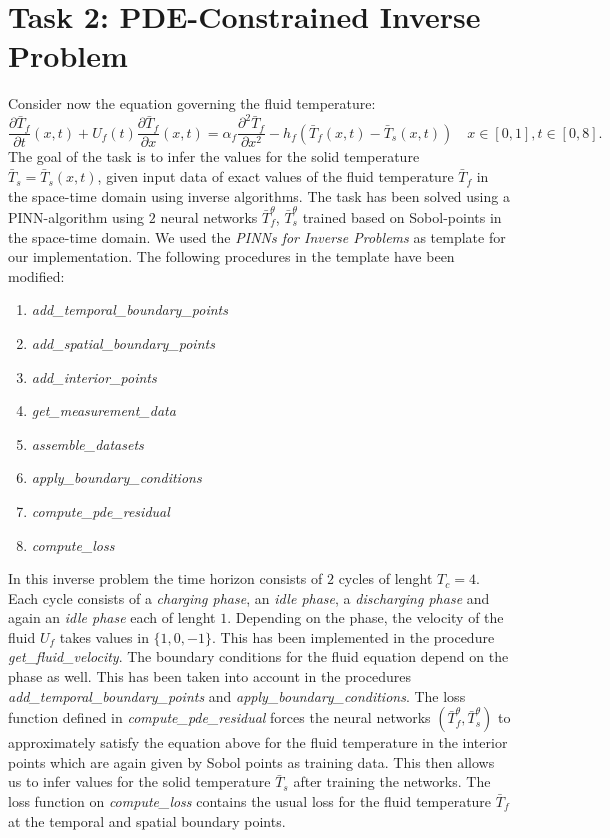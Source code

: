 \documentclass[letterpaper,12pt]{article}
\begin{document}
\section*{Task 2: PDE-Constrained Inverse Problem}
Consider now the equation governing the fluid temperature:
\begin{equation*}
\frac{\partial \bar{T}_{f}}{\partial t}(x, t)+U_{f}(t) \frac{\partial \bar{T}_{f}}{\partial x}(x, t)=\alpha_{f} \frac{\partial^{2} \bar{T}_{f}}{\partial x^{2}}-h_{f}\left(\bar{T}_{f}(x, t)-\bar{T}_{s}(x, t)\right) \quad x \in[0,1], t \in[0,8].
\end{equation*}
The goal of the task is to infer the values for the solid temperature $\bar{T}_{s}=\bar{T}_{s}(x, t)$, given input data of exact values of the fluid temperature $\bar{T}_{f}$ in the space-time domain using inverse algorithms.
The task has been solved using a PINN-algorithm using $2$ neural networks $\bar{T}_{f}^{\theta}$, $\bar{T}_{s}^{\theta}$ trained based on Sobol-points in the space-time domain. We used the  \textit{PINNs for Inverse Problems} as template for our implementation.
The following procedures in the template have been modified:
\begin{enumerate}
	\setlength\itemsep{-0.2em}
	\item\textit{add\_temporal\_boundary\_points}
	\item\textit{add\_spatial\_boundary\_points}
	\item\textit{add\_interior\_points}
	\item\textit{get\_measurement\_data}
	\item\textit{assemble\_datasets}
	\item\textit{apply\_boundary\_conditions}
	\item\textit{compute\_pde\_residual}
	\item\textit{compute\_loss}
\end{enumerate}



In this inverse problem the time horizon consists of $2$ cycles of lenght $T_{c}=4$. Each cycle consists of a \textit{charging phase}, an \textit{idle phase}, a \textit{discharging phase} and again an \textit{idle phase} each of lenght $1$.
Depending on the phase, the velocity of the fluid $U_{f}$ takes values in $\{1,0,-1\}$. This has been implemented in the procedure \textit{get\_fluid\_velocity}.
The boundary conditions for the fluid equation depend on the phase as well. This has been taken into account in the procedures \textit{add\_temporal\_boundary\_points} and \textit{apply\_boundary\_conditions}. The loss function defined in \textit{compute\_pde\_residual} forces the neural networks $(\bar{T}_{f}^{\theta}, \bar{T}_{s}^{\theta})$ to approximately satisfy the equation above for the fluid temperature
in the interior points which are again given by Sobol points as training data. This then allows us to infer values for the solid temperature $\bar{T}_{s}$ after training the networks. The loss function on \textit{compute\_loss} contains the usual loss for the fluid temperature $\bar{T}_{f}$ at the temporal and spatial boundary points. 
\end{document}
